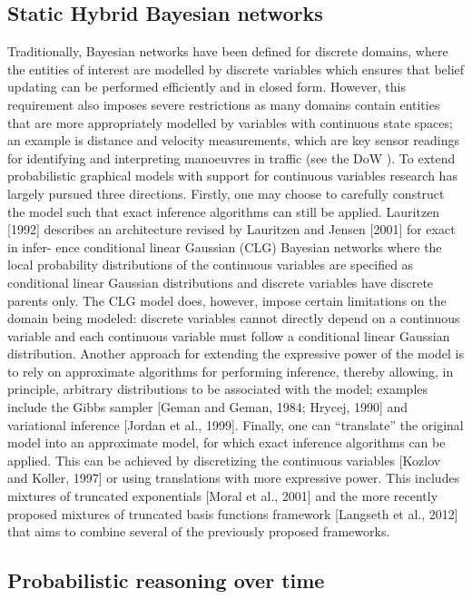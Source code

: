 \subsection{Static Hybrid Bayesian networks}\label{SubSection:HybridBNs}
Traditionally, Bayesian networks have been defined for discrete domains, where the entities of interest are modelled by discrete variables which ensures that belief updating can be performed efficiently and in closed form. However, this requirement also imposes severe restrictions as many domains contain entities that are more appropriately modelled by variables with continuous state spaces; an example is distance and velocity measurements, which are key sensor readings for identifying and interpreting manoeuvres in traffic (see the DoW \cite{Fer14}). To extend probabilistic graphical models with support for continuous variables research has largely pursued three directions. Firstly, one may choose to carefully construct the model such that exact inference algorithms can still be applied. Lauritzen [1992] describes an architecture revised by Lauritzen and Jensen [2001] for exact in infer- ence conditional linear Gaussian (CLG) Bayesian networks where the local probability distributions of the continuous variables are specified as conditional linear Gaussian distributions and discrete variables have discrete parents only. The CLG model does, however, impose certain limitations on the domain being modeled: discrete variables cannot directly depend on a continuous variable and each continuous variable must follow a conditional linear Gaussian distribution. Another approach for extending the expressive power of the model is to rely on approximate algorithms for performing inference, thereby allowing, in principle, arbitrary distributions to be associated with the model; examples include the Gibbs sampler [Geman and Geman, 1984; Hrycej, 1990] and variational inference [Jordan et al., 1999]. Finally, one can “translate” the original model into an approximate model, for which exact inference algorithms can be applied. This can be achieved by discretizing the continuous variables [Kozlov and Koller, 1997] or using translations with more expressive power. This includes mixtures of truncated exponentials [Moral et al., 2001] and the more recently proposed mixtures of truncated basis functions framework [Langseth et al., 2012] that aims to combine several of the previously proposed frameworks.

\subsection{Probabilistic reasoning over time}\label{SubSection:DBNs}

